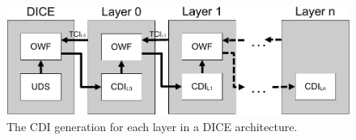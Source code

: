 \begin{figure}[htpb]
  \centering
  \includegraphics[width=1\linewidth]{figures/dice-layers.pdf}
  \caption{The CDI generation for each layer in a DICE architecture.} \label{fig:dice-layers}
\end{figure}
